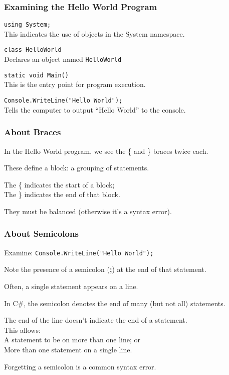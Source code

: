 \begin{frame}
\frametitle{Examining the Hello World Program}

\texttt{using System;}\\
\quad This indicates the use of objects in the System namespace.

\texttt{class HelloWorld}\\
\quad Declares an object named \texttt{HelloWorld}

\texttt{static void Main()}\\
\quad This is the entry point for program execution.

\texttt{Console.WriteLine("Hello World");}\\
\quad Tells the computer to output ``Hello World'' to the console.

\end{frame}

\begin{frame}
\frametitle{About Braces}

In the Hello World program, we see the \{ and \} braces twice each.

These define a \alert{block}: a grouping of statements.

The \{ indicates the start of a block; \\
The \} indicates the end of that block.

They must be balanced (otherwise it's a syntax error).

\end{frame}

\begin{frame}
\frametitle{About Semicolons}

Examine: \texttt{Console.WriteLine("Hello World");}

Note the presence of a semicolon (\textbf{;}) at the end of that statement.

Often, a single statement appears on a line.

In C\#, the semicolon denotes the end of many (but not all) statements.

The end of the line doesn't indicate the end of a statement.\\
This allows:\\
\quad\quad A statement to be on more than one line; or\\
\quad\quad More than one statement on a single line.

Forgetting a semicolon is a common syntax error.

\end{frame}

